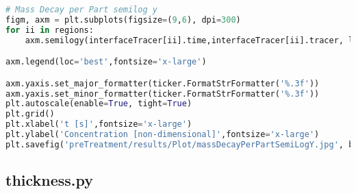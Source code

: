 \begin{lstlisting}[language=python]
# Mass Decay per Part semilog y
figm, axm = plt.subplots(figsize=(9,6), dpi=300)
for ii in regions:
    axm.semilogy(interfaceTracer[ii].time,interfaceTracer[ii].tracer, label=ii)

axm.legend(loc='best',fontsize='x-large')

axm.yaxis.set_major_formatter(ticker.FormatStrFormatter('%.3f'))
axm.yaxis.set_minor_formatter(ticker.FormatStrFormatter('%.3f'))
plt.autoscale(enable=True, tight=True)
plt.grid()
plt.xlabel('t [s]',fontsize='x-large')
plt.ylabel('Concentration [non-dimensional]',fontsize='x-large')
plt.savefig('preTreatment/results/Plot/massDecayPerPartSemiLogY.jpg', bbox_inches='tight')

\end{lstlisting}
\subsection{thickness.py}
